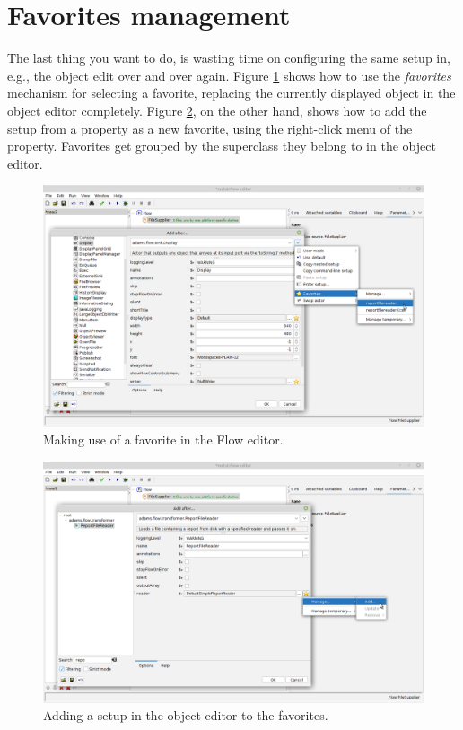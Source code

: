 \clearpage \newpage
\section{Favorites management}
The last thing you want to do, is wasting time on configuring the same setup in,
e.g., the object edit over and over again. Figure \ref{favorites-floweditor}
shows how to use the \textit{favorites} mechanism for selecting a favorite,
replacing the currently displayed object in the object editor completely. Figure
\ref{favorites-goe}, on the other hand, shows how to add the setup from a
property as a new favorite, using the right-click menu of the property.
Favorites get grouped by the superclass they belong to in the object editor.

\begin{figure}[htb]
  \centering
  \includegraphics[width=12.0cm]{images/favorites-floweditor.png}
  \caption{Making use of a favorite in the Flow editor.}
  \label{favorites-floweditor}
\end{figure}

\begin{figure}[htb]
  \centering
  \includegraphics[width=12.0cm]{images/favorites-goe.png}
  \caption{Adding a setup in the object editor to the favorites.}
  \label{favorites-goe}
\end{figure}


